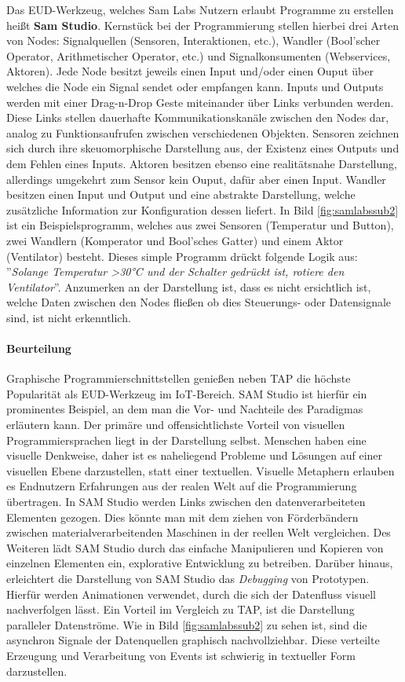 Das \ac{EUD}-Werkzeug, welches Sam Labs Nutzern erlaubt Programme zu erstellen heißt \textbf{Sam Studio}. Kernstück bei der Programmierung stellen hierbei drei Arten von Nodes: Signalquellen (Sensoren, Interaktionen, etc.), Wandler (Bool'scher Operator, Arithmetischer Operator, etc.) und Signalkonsumenten (Webservices, Aktoren). Jede Node besitzt jeweils einen Input und/oder einen Ouput über welches die Node ein Signal sendet oder empfangen kann. Inputs und Outputs werden mit einer Drag-n-Drop Geste miteinander über Links verbunden werden. Diese Links stellen dauerhafte Kommunikationskanäle zwischen den Nodes dar, analog zu Funktionsaufrufen zwischen verschiedenen Objekten. Sensoren zeichnen sich durch ihre skeuomorphische Darstellung aus, der Existenz eines Outputs und dem Fehlen eines Inputs. Aktoren besitzen ebenso eine realitätsnahe Darstellung, allerdings umgekehrt zum Sensor kein Ouput, dafür aber einen Input. Wandler besitzen einen Input und Output und eine abstrakte Darstellung, welche zusätzliche Information zur Konfiguration dessen liefert. In Bild \ref{fig:samlabssub2} ist ein Beispielsprogramm, welches aus zwei Sensoren (Temperatur und Button), zwei Wandlern (Komperator und Bool'sches Gatter) und einem Aktor (Ventilator) besteht. Dieses simple Programm drückt folgende Logik aus: ''\textit{Solange Temperatur >30°C und der Schalter gedrückt ist, rotiere den Ventilator}''. Anzumerken an der Darstellung ist, dass es nicht ersichtlich ist, welche Daten zwischen den Nodes fließen ob dies Steuerungs- oder Datensignale sind, ist nicht erkenntlich. 

\paragraph{Beurteilung} Graphische Programmierschnittstellen genießen neben \ac{TAP} die höchste Popularität als \ac{EUD}-Werkzeug im \ac{IoT}-Bereich. SAM Studio ist hierfür ein prominentes Beispiel, an dem man die Vor- und Nachteile des Paradigmas erläutern kann. Der primäre und offensichtlichste Vorteil von visuellen Programmiersprachen liegt in der Darstellung selbst. Menschen haben eine visuelle Denkweise, daher ist es naheliegend Probleme und Lösungen auf einer visuellen Ebene darzustellen, statt einer textuellen. Visuelle Metaphern erlauben es Endnutzern Erfahrungen aus der realen Welt auf die Programmierung übertragen. In SAM Studio werden Links zwischen den datenverarbeiteten Elementen gezogen. Dies könnte man mit dem ziehen von Förderbändern zwischen materialverarbeitenden Maschinen in der reellen Welt vergleichen. Des Weiteren lädt SAM Studio durch das einfache Manipulieren und Kopieren von einzelnen Elementen ein, explorative Entwicklung zu betreiben. Darüber hinaus, erleichtert die Darstellung von SAM Studio das \textit{Debugging} von Prototypen. Hierfür werden Animationen verwendet, durch die sich der Datenfluss visuell nachverfolgen lässt. Ein Vorteil im Vergleich zu \ac{TAP}, ist die Darstellung paralleler Datenströme. Wie in Bild \ref{fig:samlabssub2} zu sehen ist, sind die asynchron Signale der Datenquellen graphisch nachvollziehbar. Diese verteilte Erzeugung und Verarbeitung von Events ist schwierig in textueller Form darzustellen. 

